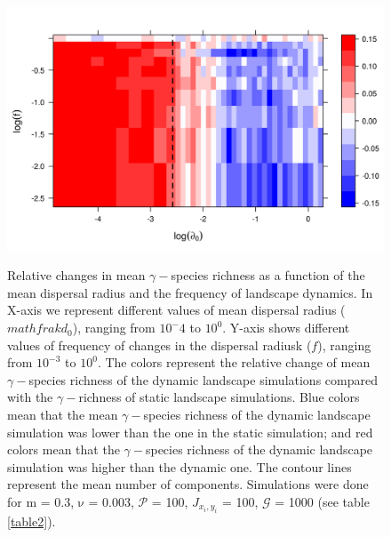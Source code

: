 \documentclass[a4paper,12pt]{article}
\begin{document}
\begin{figure}[hb!]
\begin{center}
\includegraphics[width=\textwidth]{newfigures/relativelevelplot_rich.png}
\label{fig:phasespace_rich}
\caption{
Relative changes in mean $\gamma-$species richness as a function of the mean dispersal radius and the frequency of landscape dynamics. In X-axis we represent different values of mean dispersal radius ($mathfrak{d_{0}}$), ranging from $10^-4$ to $10^0$. Y-axis shows different values of frequency of changes in the dispersal radiusk ($f$), ranging from $10^{-3}$ to $10^0$. The colors represent the relative change of mean $\gamma-$species richness of the dynamic landscape simulations compared with the $\gamma-$richness of static landscape simulations. Blue colors mean that the mean $\gamma-$species richness of the dynamic landscape simulation was lower than the one in the static simulation; and red colors mean that the $\gamma-$species richness of the dynamic landscape simulation was higher than the dynamic one. The contour lines represent the mean number of components. Simulations were done for $\mathrm{m}$ = 0.3, $\mathrm{\nu}$ = 0.003, $\mathcal{P}$ = 100, $J_{x_i,y_i}$ = 100, $\mathcal{G}$ = 1000 (see table \ref{table2}).
}
\end{center}
\end{figure}
\end{document}

